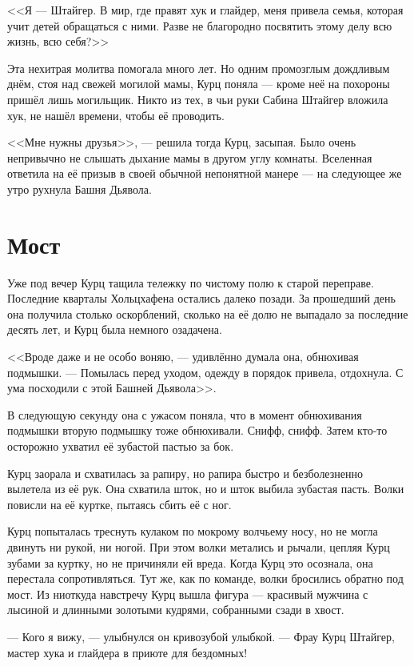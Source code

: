 <<Я --- Штайгер.
В мир, где правят хук и глайдер, меня привела семья, которая учит детей обращаться с ними.
Разве не благородно посвятить этому делу всю жизнь, всю себя?>>

Эта нехитрая молитва помогала много лет.
Но одним промозглым дождливым днём, стоя над свежей могилой мамы, Курц поняла --- кроме неё на похороны пришёл лишь могильщик.
Никто из тех, в чьи руки Сабина Штайгер вложила хук, не нашёл времени, чтобы её проводить.

<<Мне нужны друзья>>, --- решила тогда Курц, засыпая.
Было очень непривычно не слышать дыхание мамы в другом углу комнаты.
Вселенная ответила на её призыв в своей обычной непонятной манере --- на следующее же утро рухнула Башня Дьявола.

\section{Мост}

Уже под вечер Курц тащила тележку по чистому полю к старой переправе.
Последние кварталы Хольцхафена остались далеко позади.
За прошедший день она получила столько оскорблений, сколько на её долю не выпадало за последние десять лет, и Курц была немного озадачена.

<<Вроде даже и не особо воняю, --- удивлённо думала она, обнюхивая подмышки.
--- Помылась перед уходом, одежду в порядок привела, отдохнула.
С ума посходили с этой Башней Дьявола>>.

В следующую секунду она с ужасом поняла, что в момент обнюхивания подмышки вторую подмышку тоже обнюхивали.
Снифф, снифф.
Затем кто-то осторожно ухватил её зубастой пастью за бок.

Курц заорала и схватилась за рапиру, но рапира быстро и безболезненно вылетела из её рук.
Она схватила шток, но и шток выбила зубастая пасть.
Волки повисли на её куртке, пытаясь сбить её с ног.

Курц попыталась треснуть кулаком по мокрому волчьему носу, но не могла двинуть ни рукой, ни ногой.
При этом волки метались и рычали, цепляя Курц зубами за куртку, но не причиняли ей вреда.
Когда Курц это осознала, она перестала сопротивляться.
Тут же, как по команде, волки бросились обратно под мост.
Из ниоткуда навстречу Курц вышла фигура --- красивый мужчина с лысиной и длинными золотыми кудрями, собранными сзади в хвост.

--- Кого я вижу, --- улыбнулся он кривозубой улыбкой.
--- Фрау Курц Штайгер, мастер хука и глайдера в приюте для бездомных!

